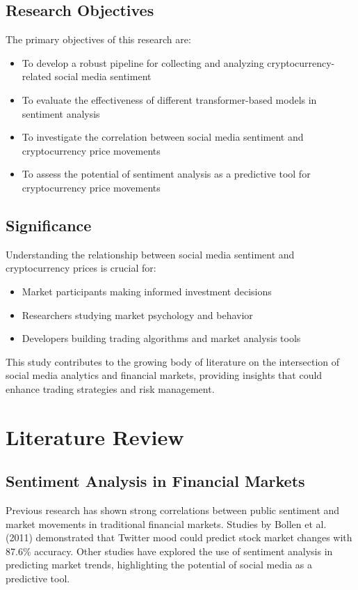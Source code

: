 \documentclass[12pt,a4paper]{report}
\begin{document}
\section{Research Objectives}
The primary objectives of this research are:
\begin{itemize}
    \item To develop a robust pipeline for collecting and analyzing
          cryptocurrency-related social media sentiment
    \item To evaluate the effectiveness of different transformer-based models in
          sentiment analysis
    \item To investigate the correlation between social media sentiment and
          cryptocurrency price movements
    \item To assess the potential of sentiment analysis as a predictive tool for
          cryptocurrency price movements
\end{itemize}

\section{Significance}
Understanding the relationship between social media sentiment and
cryptocurrency prices is crucial for:
\begin{itemize}
    \item Market participants making informed investment decisions
    \item Researchers studying market psychology and behavior
    \item Developers building trading algorithms and market analysis tools
\end{itemize}
This study contributes to the growing body of literature on the intersection of social media analytics and financial markets, providing insights that could enhance trading strategies and risk management.

\chapter{Literature Review}
\section{Sentiment Analysis in Financial Markets}
Previous research has shown strong correlations between public sentiment and
market movements in traditional financial markets. Studies by Bollen et al.
(2011) demonstrated that Twitter mood could predict stock market changes with
87.6\% accuracy. Other studies have explored the use of sentiment analysis in
predicting market trends, highlighting the potential of social media as a
predictive tool.
\end{document}
